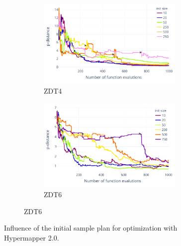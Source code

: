 \begin{figure}[!h]
            
            \begin{subfigure}{\textwidth}
                \begin{subfigure}{0.45\textwidth}
                    \includegraphics[width=\textwidth]{content/images/hypermapper_zdt4_start_set}
                    \caption{ZDT4}
                    \label{fig:hmapper_zdt4_start_set}
                \end{subfigure}
                \begin{subfigure}{0.45\textwidth}
                    \includegraphics[width=\textwidth]{content/images/hypermapper_zdt6_start_set}
                    \caption{ZDT6}
                    \label{fig:hmapper_zdt6_start_set}
                \end{subfigure}
            \end{subfigure} 

            \caption[Influence of the initial sample plan for optimization with Hypermapper 2.0.]{Influence of the initial sample plan for optimization with Hypermapper 2.0.}
            \label{fig:hmapper_start_set}    
        \end{figure}

